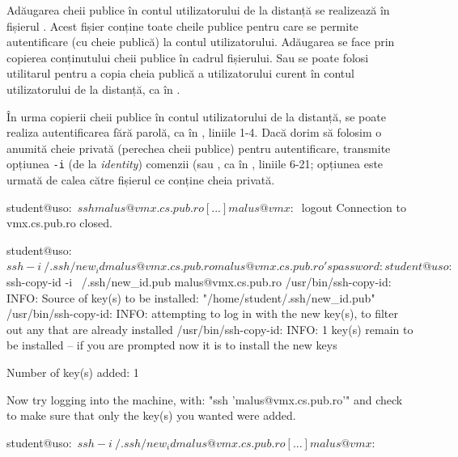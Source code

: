 Adăugarea cheii publice în contul utilizatorului de la distanță se realizează în fișierul .
Acest fișier conține toate cheile publice pentru care se permite autentificare (cu cheie publică) la contul utilizatorului.
Adăugarea se face prin copierea conținutului cheii publice în cadrul fișierului.
Sau se poate folosi utilitarul  pentru a copia cheia publică a utilizatorului curent în contul utilizatorului de la distanță, ca în .


În urma copierii cheii publice în contul utilizatorului de la distanță, se poate realiza autentificarea fără parolă, ca în , liniile 1-4.
Dacă dorim să folosim o anumită cheie privată (perechea cheii publice) pentru autentificare, transmite opțiunea \texttt{-i} (de la \textit{identity}) comenzii  (sau , ca în , liniile 6-21; opțiunea este urmată de calea către fișierul ce conține cheia privată.

\begin{screen}[caption={Autentificarea SSH cu cheie publică},label={lst:sec:ssh-pub-auth}]
student@uso:~$ ssh malus@vmx.cs.pub.ro
[...]
malus@vmx:~$ logout
Connection to vmx.cs.pub.ro closed.

student@uso:~$ ssh -i ~/.ssh/new_id malus@vmx.cs.pub.ro
malus@vmx.cs.pub.ro's password:

student@uso:~$ ssh-copy-id -i ~/.ssh/new_id.pub malus@vmx.cs.pub.ro
/usr/bin/ssh-copy-id: INFO: Source of key(s) to be installed: "/home/student/.ssh/new_id.pub"
/usr/bin/ssh-copy-id: INFO: attempting to log in with the new key(s), to filter out any that are already installed
/usr/bin/ssh-copy-id: INFO: 1 key(s) remain to be installed -- if you are prompted now it is to install the new keys

Number of key(s) added: 1

Now try logging into the machine, with:   "ssh 'malus@vmx.cs.pub.ro'"
and check to make sure that only the key(s) you wanted were added.

student@uso:~$ ssh -i ~/.ssh/new_id malus@vmx.cs.pub.ro
[...]
malus@vmx:~$
\end{screen}

